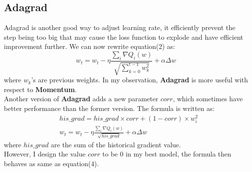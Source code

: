 \documentclass[11pt]{article}
\newcommand\n{\mbox{\qquad}}
\begin{document}
\subsection{Adagrad}
\n Adagrad is another good way to adjust learning rate, it efficiently prevent the step being too big that may cause the loss function to explode and have efficient improvement further. We can now rewrite equation(2) as:
	\begin{equation}
		w_t = w_t - \eta \frac{\sum_i \nabla Q_i(w)}{\sqrt{\sum_{k=0}^{t-1} w_k^2}} + \alpha \Delta w
	\end{equation}
where $w_k$'s are previous weights. In my observation, \textbf{Adagrad} is more useful with respect to \textbf{Momentum}. \\
\n Another version of \textbf{Adagrad} adds a new parameter $corr$, which sometimes have better performance than the former version. The formula is written as:
\begin{align*}
	&his\_grad = his\_grad \times corr + (1-corr) \times w_i^2 \\
 	&w_t = w_t - \eta \frac{\sum_i \nabla Q_i(w)}{\sqrt{his\_grad}} + \alpha \Delta w
\end{align*}
where $his\_grad$ are the sum of the historical gradient value.\\
\n However, I design the value $corr$ to be 0 in my best model, the formula then behaves as same as equation(4).
\end{document}
